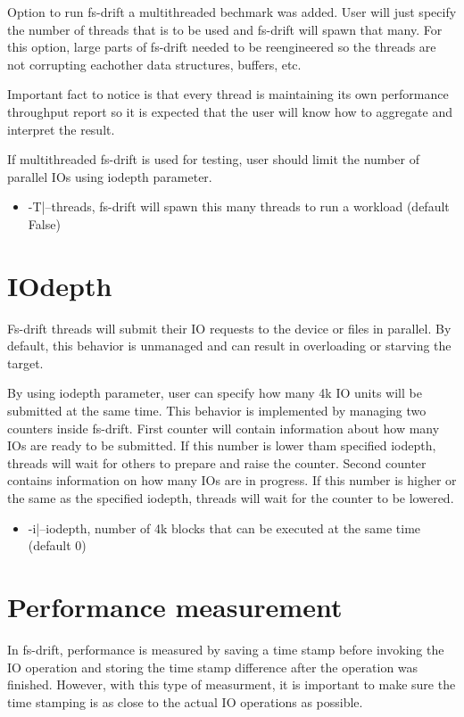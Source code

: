 \documentclass[
  color, %
  table, %
  lof,   %
  lot,   %
]{fithesis3}
\begin{document}
Option to run fs-drift a multithreaded bechmark was added. User will just specify the number of threads that is to be used and fs-drift will spawn that many. For this option, large parts of fs-drift needed to be reengineered so the threads are not corrupting eachother data structures, buffers, etc.

Important fact to notice is that every thread is maintaining its own performance throughput report so it is expected that the user will know how to aggregate and interpret the result.

If multithreaded fs-drift is used for testing, user should limit the number of parallel IOs using iodepth parameter.


\begin{itemize}
    \item -T|--threads, fs-drift will spawn this many threads to run a workload (default False)
\end{itemize}

\section{IOdepth}
Fs-drift threads will submit their IO requests to the device or files in parallel. By default, this behavior is unmanaged and can result in overloading or starving the target.

By using iodepth parameter, user can specify how many 4k IO units will be submitted at the same time. This behavior is implemented by managing two counters inside fs-drift. First counter will contain information about how many IOs are ready to be submitted. If this number is lower tham specified iodepth, threads will wait for others to prepare and raise the counter. Second counter contains information on how many IOs are in progress. If this number is higher or the same as the specified iodepth, threads will wait for the counter to be lowered.


\begin{itemize}
    \item -i|--iodepth, number of 4k blocks that can be executed at the same time (default 0)
\end{itemize}



\section{Performance measurement}
In fs-drift, performance is measured by saving a time stamp before invoking the IO operation and storing the time stamp difference after the operation was finished. However, with this type of measurment, it is important to make sure the time stamping is as close to the actual IO operations as possible. 
\end{document}
